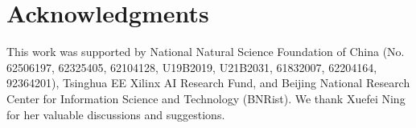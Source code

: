 \section*{Acknowledgments}

This work was supported by National Natural Science Foundation of China (No. 62506197, 62325405, 62104128, U19B2019, U21B2031, 61832007, 62204164, 92364201), Tsinghua EE Xilinx AI Research Fund, and Beijing National Research Center for Information Science and Technology (BNRist).
We thank Xuefei Ning for her valuable discussions and suggestions.